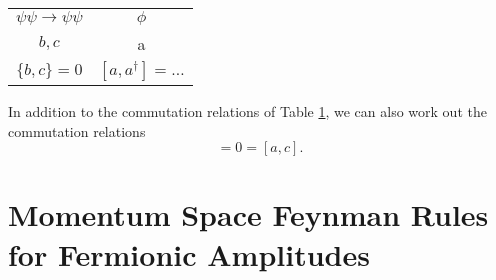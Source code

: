 
\begin{table}[htpb]
  \centering
  \begin{tabular}{c c}
  $\psi\psi \to \psi\psi$ &  $\phi$ \\
  $b, c$ & a \\
  $\{b, c\} = 0$ & $[a, a^{\dagger}] = \dots$ \\
  \end{tabular}
  \caption{}
  \label{tab:18-1}
\end{table}

In addition to the commutation relations of Table \ref{tab:18-1}, we can also work out the commutation relations 
\begin{equation}
  [a, b] = 0 = [a, c].
\end{equation}

\section{Momentum Space Feynman Rules for Fermionic Amplitudes}%
\label{sec:momentum_space_feynman_rules_for_fermionic_amplitudes}



